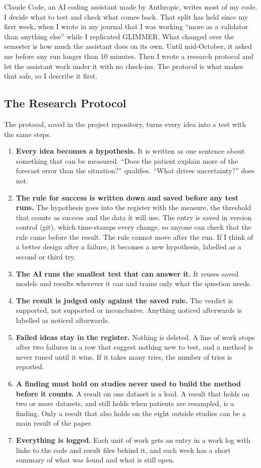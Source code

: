 Claude Code, an AI coding assistant made by Anthropic, writes most of my code. I decide what to test and check what comes back. That split has held since my first week, when I wrote in my journal that I was working ``more as a validator than anything else'' while I replicated GLIMMER. What changed over the semester is how much the assistant does on its own. Until mid-October, it asked me before any run longer than 10 minutes. Then I wrote a research protocol and let the assistant work under it with no check-ins. The protocol is what makes that safe, so I describe it first.

\subsection{The Research Protocol}

The protocol, saved in the project repository, turns every idea into a test with the same steps.

\begin{enumerate}
\item \textbf{Every idea becomes a hypothesis.} It is written as one sentence about something that can be measured. ``Does the patient explain more of the forecast error than the situation?'' qualifies. ``What drives uncertainty?'' does not.
\item \textbf{The rule for success is written down and saved before any test runs.} The hypothesis goes into the register with the measure, the threshold that counts as success and the data it will use. The entry is saved in version control (git), which time-stamps every change, so anyone can check that the rule came before the result. The rule cannot move after the run. If I think of a better design after a failure, it becomes a new hypothesis, labelled as a second or third try.
\item \textbf{The AI runs the smallest test that can answer it.} It reuses saved models and results wherever it can and trains only what the question needs.
\item \textbf{The result is judged only against the saved rule.} The verdict is supported, not supported or inconclusive. Anything noticed afterwards is labelled as noticed afterwards.
\item \textbf{Failed ideas stay in the register.} Nothing is deleted. A line of work stops after two failures in a row that suggest nothing new to test, and a method is never tuned until it wins. If it takes many tries, the number of tries is reported.
\item \textbf{A finding must hold on studies never used to build the method before it counts.} A result on one dataset is a lead. A result that holds on two or more datasets, and still holds when patients are resampled, is a finding. Only a result that also holds on the eight outside studies can be a main result of the paper.
\item \textbf{Everything is logged.} Each unit of work gets an entry in a work log with links to the code and result files behind it, and each week has a short summary of what was found and what is still open.
\end{enumerate}

